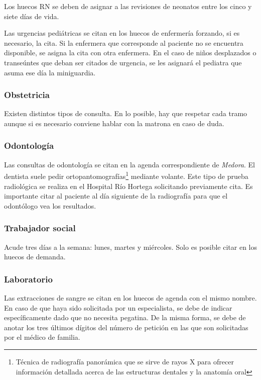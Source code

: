 Los huecos RN se deben de asignar a las revisiones de neonatos entre los cinco y siete días de vida.

Las urgencias pediátricas se citan en los huecos de enfermería forzando, si es necesario, la cita. Si la enfermera que corresponde al paciente no se encuentra disponible, se asigna la cita con otra enfermera.
En el caso de niños desplazados o transeúntes que deban ser citados de urgencia, se les asignará el pediatra que asuma ese día la miniguardia.

\subsubsection{Obstetricia}

Existen distintos tipos de consulta. En lo posible, hay que respetar cada tramo aunque si es necesario conviene hablar con la matrona en caso de duda.

\subsubsection{Odontología}

Las consultas de odontología se citan en la agenda correspondiente de \textit{Medora}.
El dentista suele pedir ortopantomografías\footnote{Técnica de radiografía panorámica que se sirve de rayos X para ofrecer información detallada acerca de las estructuras dentales y la anatomía oral} mediante volante. Este tipo de prueba radiológica se realiza en el Hospital Río Hortega solicitando previamente cita.
Es importante citar al paciente al día siguiente de la radiografía para que el odontólogo vea los resultados.

\subsubsection{Trabajador social}

Acude tres días a la semana: lunes, martes y miércoles.
Solo es posible citar en los huecos de demanda.

\subsubsection{Laboratorio}

Las extracciones de sangre se citan en los huecos de agenda con el mismo nombre.
En caso de que haya sido solicitada por un especialista, se debe de indicar específicamente dado que no necesita pegatina.
De la misma forma, se debe de anotar los tres últimos dígitos del número de petición en las que son solicitadas por el médico de familia.

